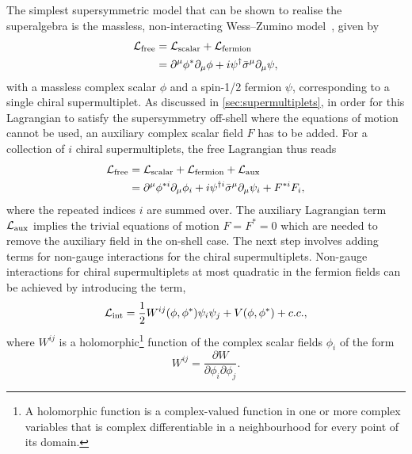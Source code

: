 The simplest supersymmetric model that can be shown to realise the superalgebra is the massless, non-interacting Wess--Zumino model~\cite{WESS197439,Martin:1997ns}, given by 
\begin{equation}
\begin{split}
	\mathcal{L}_\mathrm{free} & = \mathcal{L}_\mathrm{scalar} + \mathcal{L}_\mathrm{fermion} \\
	& = \partial^\mu\phi^*\partial_\mu\phi + i\psi^\dagger\bar{\sigma}^\mu\partial_\mu\psi,
	\label{eq:wess_zumino_free}
\end{split}
\end{equation}
with a massless complex scalar $\phi$ and a spin-1/2 fermion $\psi$, corresponding to a single chiral supermultiplet. As discussed in \cref{sec:supermultiplets}, in order for this Lagrangian to satisfy the supersymmetry off-shell where the equations of motion cannot be used, an auxiliary complex scalar field $F$ has to be added. For a collection of $i$ chiral supermultiplets, the free Lagrangian thus reads
\begin{equation}
\begin{split}
	\mathcal{L}_\mathrm{free} & = \mathcal{L}_\mathrm{scalar} + \mathcal{L}_\mathrm{fermion} + \mathcal{L}_\mathrm{aux} \\
	 & = \partial^\mu\phi^{*i}\partial_\mu\phi_i + i\psi^{\dagger i}\bar{\sigma}^\mu\partial_\mu\psi_i + F^{*i}F_i,
\end{split}
\label{eq:free_wess_zumino}
\end{equation} 
where the repeated indices $i$ are summed over. The auxiliary Lagrangian term $\mathcal{L}_\mathrm{aux}$ implies the trivial equations of motion $F = F^* = 0$ which are needed to remove the auxiliary field in the on-shell case. The next step involves adding terms for non-gauge interactions for the chiral supermultiplets. Non-gauge interactions for chiral supermultiplets at most quadratic in the fermion fields can be achieved by introducing the term,
\begin{equation}
	\mathcal{L}_\mathrm{int} = \frac{1}{2}W^{ij}(\phi,\phi^*)\psi_i \psi_j + V(\phi,\phi^*) + c.c.,
	\label{eq:wess_zumino_int}
\end{equation}
where $W^{ij}$ is a holomorphic\footnote{A holomorphic function is a complex-valued function in one or more complex variables that is complex differentiable in a neighbourhood for every point of its domain.} function of the complex scalar fields $\phi_i$ of the form~\cite{Bustamante:2009us}
\begin{equation}
	W^{ij} = \frac{\partial W}{\partial\phi_i\partial\phi_j}. 
\end{equation}
